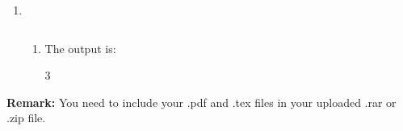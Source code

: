 \documentclass[12pt,a4paper]{article}
\makeatletter
\newtheorem*{solution}{Solution}
\theoremstyle{definition}
\renewenvironment{solution}[1][Solution] {\par\pushQED{\qed}\normalfont\topsep6\p@\@plus6\p@\relax\trivlist\item[\hskip\labelsep\bfseries#1\@addpunct{.}]\ignorespaces}{\popQED\endtrivlist\@endpefalse} \makeatother
\makeatother
\begin{document}
\begin{enumerate}
\begin{solution}
\begin{enumerate}

		   \item 


		   \inputminted[]{cpp}{Code-SetCover.cpp}%

		   The output is:
		   \begin{tcolorbox}
			3
		   \end{tcolorbox}
		   
	   \end{enumerate}
   \end{solution}

\end{enumerate}



\vspace{20pt}

\textbf{Remark:} You need to include your .pdf and .tex files in your uploaded .rar or .zip file.

\end{document}
